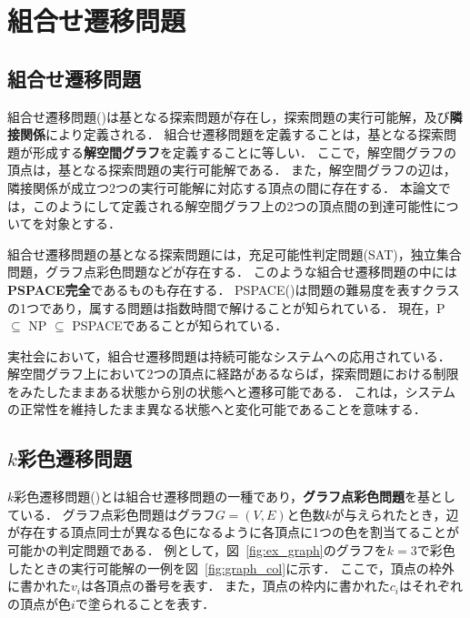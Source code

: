 \chapter{組合せ遷移問題} \label{chap:background}

\section{組合せ遷移問題}
組合せ遷移問題(\cite{Ito18:tohoku})は基となる探索問題が存在し，探索問題の実行可能解，及び\textbf{隣接関係}により定義される．
組合せ遷移問題を定義することは，基となる探索問題が形成する\textbf{解空間グラフ}を定義することに等しい．
ここで，解空間グラフの頂点は，基となる探索問題の実行可能解である． 
また，解空間グラフの辺は，隣接関係が成立つ2つの実行可能解に対応する頂点の間に存在する．
本論文では，このようにして定義される解空間グラフ上の2つの頂点間の到達可能性についてを対象とする．

組合せ遷移問題の基となる探索問題には，充足可能性判定問題(SAT)，独立集合問題，グラフ点彩色問題などが存在する．
このような組合せ遷移問題の中には\textbf{PSPACE完全}であるものも存在する． 
PSPACE(\cite{Kuriyama13:ieice})は問題の難易度を表すクラスの1つであり，属する問題は指数時間で解けることが知られている． 
現在，P $\subseteq$ NP $\subseteq$ PSPACEであることが知られている．

実社会において，組合せ遷移問題は持続可能なシステムへの応用されている． 
解空間グラフ上において2つの頂点に経路があるならば，探索問題における制限をみたしたままある状態から別の状態へと遷移可能である． 
これは，システムの正常性を維持したまま異なる状態へと変化可能であることを意味する．

\section{$k$彩色遷移問題}
$k$彩色遷移問題(\cite{BC2009:tcs})とは組合せ遷移問題の一種であり，\textbf{グラフ点彩色問題}を基としている． 
グラフ点彩色問題はグラフ$G=(V, E)$と色数$k$が与えられたとき，辺が存在する頂点同士が異なる色になるように各頂点に1つの色を割当てることが可能かの判定問題である． 
例として，図~\ref{fig:ex_graph}のグラフを$k=3$で彩色したときの実行可能解の一例を図~\ref{fig:graph_col}に示す． 
ここで，頂点の枠外に書かれた$v_i$は各頂点の番号を表す．
また，頂点の枠内に書かれた$c_i$はそれぞれの頂点が色$i$で塗られることを表す．

